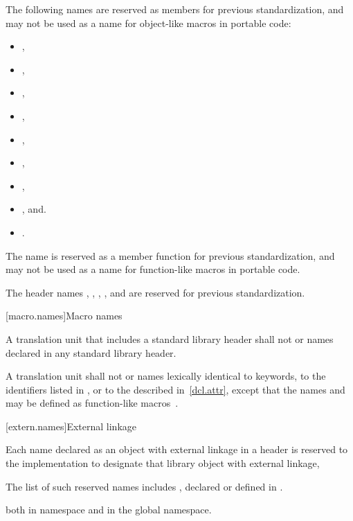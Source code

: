 \pnum
The following names are reserved as members for previous standardization,
and may not be used as a name for object-like macros in portable code:
\begin{itemize}
\item {} ,
\item {} ,
\item {} ,
\item {} ,
\item {} ,
\item {} ,
\item {} ,
\item {} , and.
\item {} .
\end{itemize}

\pnum
The name   is reserved as a
member function for previous standardization, and may not be used as a name for
function-like macros in portable code.

\pnum
The header names
,
,
,
, and
are reserved for previous standardization.

[macro.names]{Macro names}

\pnum
{}%
%
A translation unit that includes a standard library header shall not
 or  names declared in any standard
library header.

\pnum
{}%
A translation unit shall not  or 
names lexically identical
to keywords,
to the identifiers listed in , or
to the  described in~\ref{dcl.attr},
except that the names  and  may be
defined as function-like macros~.

[extern.names]{External linkage}

\pnum
Each name declared as an object with external linkage
%
in a header is reserved to the implementation to designate that library
object with external linkage,%
%
\begin{footnote}
The list of such reserved names includes
, declared or defined in .
\end{footnote}
both in namespace  and in the global namespace.

